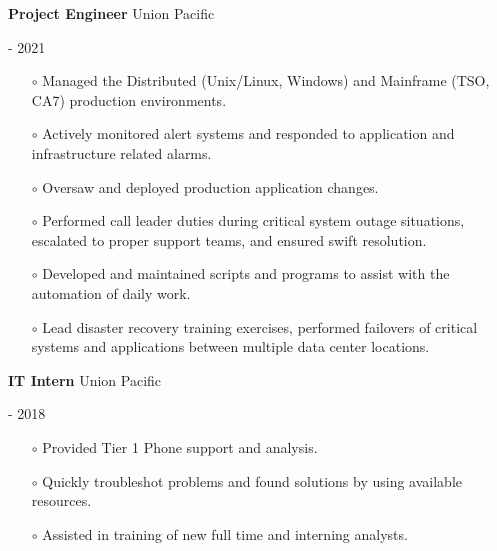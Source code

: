 \documentclass[10pt, a4paper]{article}
\begin{document}
\begin{itemize}[leftmargin=0cm]
\begin{minipage}{0.5\textwidth}
        \raggedright %
        \item \textbf{Project Engineer} Union Pacific
    \end{minipage}
    \begin{minipage}{0.5\textwidth} %
         \-- 2021
    \end{minipage}
    \begin{itemize}[leftmargin=0cm]
        \item[$\circ$] Managed the Distributed (Unix/Linux, Windows) and Mainframe (TSO, CA7) production environments.
        \item[$\circ$] Actively monitored alert systems and responded to application and infrastructure related alarms.
        \item[$\circ$] Oversaw and deployed production application changes.
        \item[$\circ$] Performed call leader duties during critical system outage situations, escalated to proper support teams, and ensured swift resolution.
        \item[$\circ$] Developed and maintained scripts and programs to assist with the automation of daily work.
        \item[$\circ$] Lead disaster recovery training exercises, performed failovers of critical systems and applications between multiple data center locations.
    \end{itemize}
    \begin{minipage}{0.5\textwidth} %
        \raggedright %
        \item \textbf{IT Intern} Union Pacific
    \end{minipage}
    \begin{minipage}{0.5\textwidth} %
         \-- 2018
    \end{minipage}
    \begin{itemize}[leftmargin=0cm]
        \item[$\circ$] Provided Tier 1 Phone support and analysis.
        \item[$\circ$] Quickly troubleshot problems and found solutions by using available resources.
        \item[$\circ$] Assisted in training of new full time and interning analysts.
    \end{itemize}
\end{itemize}
\end{document}

